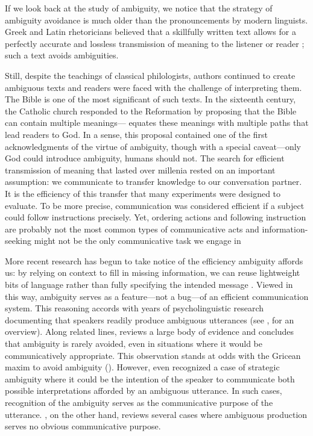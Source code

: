 \documentclass[10pt,a4paper]{article}
\newcommand{\gcs}[1]{\textcolor{blue}{[gcs: #1]}}
\begin{document}
If we look back at the study of ambiguity, we notice that the strategy of ambiguity avoidance is much older than the pronouncements by modern linguists. Greek and Latin rhetoricians believed that a skillfully written text allows for a perfectly accurate and lossless transmission of meaning to the listener or reader \cite{ossarichardson2019}; such a text avoids ambiguities.

Still, despite the teachings of classical philologists, authors continued to  create ambiguous texts and readers were faced with the challenge of interpreting them. The Bible is one of the most significant of such texts. In the sixteenth century, the Catholic church responded to the Reformation by proposing that the Bible can contain multiple meanings--- equates these meanings with multiple paths that lead readers to God. In a sense, this proposal contained one of the first acknowledgments of the virtue of ambiguity, though with a  special caveat---only God could introduce ambiguity, humans should not. The search for efficient transmission of meaning that lasted over millenia rested on an important assumption: we communicate to transfer knowledge to our conversation partner. It is the efficiency of this transfer that many experiments were designed to evaluate. To be more precise, communication was considered efficient if a subject could follow instructions precisely. Yet, ordering actions and following instruction are probably not  the most common types of communicative acts \cite{foppa1995mutual} and information-seeking might not be the only communicative task we engage in \cite{markova1995preface}

More recent research has begun to take notice of the efficiency ambiguity affords us: by relying on context to fill in missing information, we can reuse lightweight bits of language rather than fully specifying the intended message \cite{levinson2000,piantadosietal2012,wasow2015}. 
Viewed in this way, ambiguity serves as a feature---not a bug---of an efficient communication system.
This reasoning accords with years of psycholinguistic research documenting that speakers readily produce ambiguous utterances (see , for an overview). 
Along related lines,  reviews a large body of evidence and concludes that ambiguity is rarely avoided, even in situations where it would be communicatively appropriate.
This observation stands at odds with the Gricean maxim to avoid ambiguity ().
However, even \citeauthor{grice1975} recognized a case of strategic ambiguity where it could be the intention of the speaker to communicate both possible interpretations afforded by an ambiguous utterance. In such cases, recognition of the ambiguity serves as the communicative purpose of the utterance. \citeauthor{wasow2015}, on the other hand, reviews several cases where ambiguous production serves no obvious communicative purpose.
\end{document}
